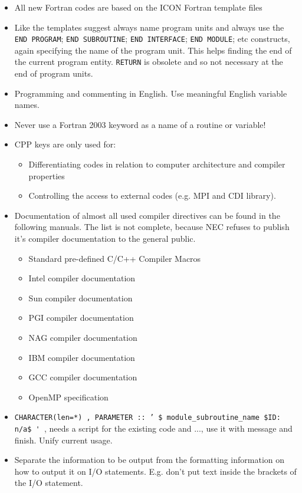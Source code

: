 \documentclass[a4paper,11pt,DIV16,BCOR1cm,titlepage]{scrartcl}
\begin{document}
\begin{itemize}  
\item All new Fortran codes are based on the ICON Fortran template files
\item Like the templates suggest always name program units and always use the \texttt{END  
PROGRAM}; \texttt{END SUBROUTINE}; \texttt{END INTERFACE}; \texttt{END 
MODULE}; etc constructs, again specifying the name of the program  
unit. This helps finding the end of the current program  
entity. \texttt{RETURN} is obsolete and so not necessary at the end of  
program units.
\item Programming and commenting in English. Use meaningful English variable names.
\item Never use a Fortran 2003 keyword as a name of a routine or variable!
\item CPP keys are only used for:
\begin{itemize}  
\item Differentiating codes in relation to computer architecture and compiler properties
\item Controlling the access to external codes (e.g. MPI and CDI library).
\end{itemize}  
\item Documentation of almost all used compiler directives can be found in the following 
manuals. The list is not complete, because NEC refuses to publish it's compiler 
documentation to the general public.
\begin{itemize}  
\item Standard pre-defined C/C++ Compiler Macros
\item  Intel compiler documentation
\item  Sun compiler documentation
\item  PGI compiler documentation
\item  NAG compiler documentation
\item  IBM compiler documentation
\item  GCC compiler documentation
\item  OpenMP specification
\end{itemize}  
\item \texttt{CHARACTER(len=*) , PARAMETER :: ' \$ module\_subroutine\_name \$ID: n/a\$ \' }, 
needs a script for the existing code and ..., use it with message and finish. Unify current usage.
\item Separate the information to be output from the formatting
  information on how to output it on I/O statements. E.g. don't put
  text inside the brackets of the I/O statement.
\end{itemize} 
\end{document}
